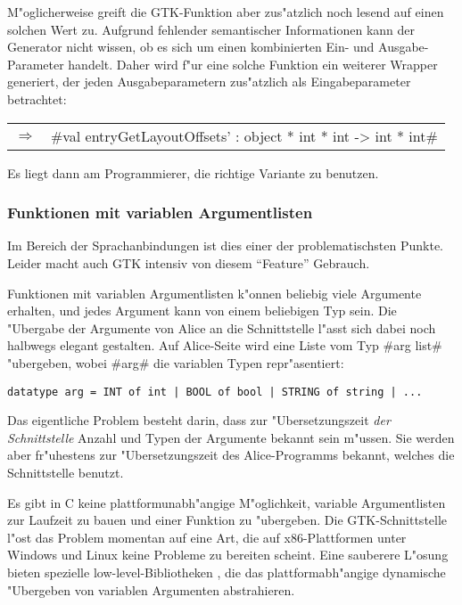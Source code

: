\documentclass[a4paper,titlepage]{article}
\newcommand{\doparskip}{\bigskip}
\newcommand{\ra}{$\Longrightarrow$}
\begin{document}
M"oglicherweise greift die GTK-Funktion aber zus"atzlich noch lesend auf 
einen solchen Wert zu. Aufgrund fehlender semantischer Informationen kann
der Generator nicht wissen, ob es sich um einen kombinierten Ein- und
Ausgabe-Parameter handelt.
Daher wird f"ur eine solche Funktion ein weiterer Wrapper generiert,
der jeden Ausgabeparametern zus"atzlich als Eingabeparameter betrachtet:
\doparskip

\begin{tabular}{rl}
  \ra & #val entryGetLayoutOffsets' : object * int * int -> int * int#
\end{tabular}
\doparskip

Es liegt dann am Programmierer, die richtige Variante zu benutzen.

\subsubsection*{Funktionen mit variablen Argumentlisten}

Im Bereich der Sprachanbindungen ist dies einer der problematischsten
Punkte. Leider macht auch GTK intensiv von diesem ``Feature'' Gebrauch.

Funktionen mit variablen Argumentlisten k"onnen beliebig viele Argumente
erhalten, und jedes Argument kann von einem beliebigen Typ sein.
Die "Ubergabe der Argumente von Alice an die Schnittstelle l"asst sich dabei
noch halbwegs elegant gestalten. Auf Alice-Seite wird eine Liste vom Typ
#arg list# "ubergeben, wobei #arg# die variablen Typen repr"asentiert:

\begin{verbatim}
datatype arg = INT of int | BOOL of bool | STRING of string | ...
\end{verbatim}

Das eigentliche Problem besteht darin, dass zur "Ubersetzungszeit
\emph{der Schnittstelle} Anzahl und Typen der Argumente bekannt sein m"ussen.
Sie werden aber fr"uhestens zur "Ubersetzungszeit des
Alice-Programms bekannt, welches die Schnittstelle benutzt.

Es gibt in C keine plattformunabh"angige M"oglichkeit,
variable Argumentlisten zur Laufzeit zu bauen und einer Funktion zu "ubergeben.
Die GTK-Schnittstelle l"ost das Problem momentan auf eine Art, die
auf x86-Plattformen unter Windows und Linux keine Probleme
zu bereiten scheint.
Eine sauberere L"osung bieten spezielle low-level-Bibliotheken \cite{libffi}, 
die das plattformabh"angige dynamische "Ubergeben
von variablen Argumenten abstrahieren.
\end{document}

